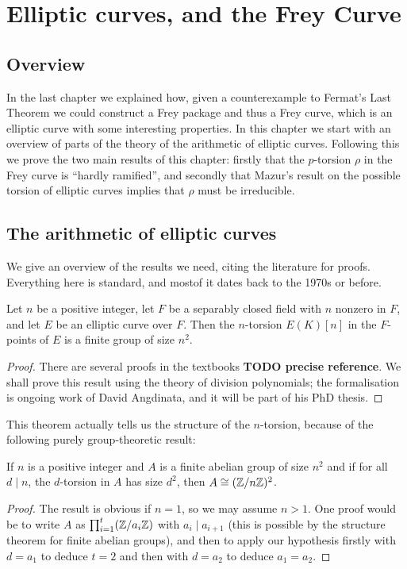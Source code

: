 \chapter{Elliptic curves, and the Frey Curve}

\section{Overview}

In the last chapter we explained how, given a counterexample to Fermat's Last Theorem we could construct a Frey package and thus a Frey curve, which is an elliptic curve with some interesting properties. In this chapter we start with an overview of parts of the theory of the arithmetic of elliptic curves. Following
this we prove the two main results of this chapter: firstly that the $p$-torsion $\rho$ in the Frey curve is ``hardly ramified'', and secondly that Mazur's result on the possible torsion of elliptic curves implies that $\rho$ must be irreducible.

\section{The arithmetic of elliptic curves}

We give an overview of the results we need, citing the literature for proofs. Everything here is
 standard, and mostof it dates back to the 1970s or before.

\begin{theorem}\label{Elliptic_curve_n_torsion_size}\tangled{}
  Let $n$ be a positive integer, let $F$ be a separably closed
  field with $n$ nonzero in $F$, and let $E$ be an elliptic curve over $F$. Then the $n$-torsion $E(K)[n]$ 
  in the $F$-points of $E$ is a finite group of size $n^2$.
\end{theorem}
\begin{proof}
  There are several proofs in the textbooks {\bf TODO precise reference}. We shall prove this result using the theory of division polynomials; the formalisation is ongoing work of David Angdinata, and it will be part of his PhD thesis.
\end{proof}

This theorem actually tells us the structure of the $n$-torsion, because of the following
purely group-theoretic result:
\begin{lemma}\label{group_theory_lemma}
  If $n$ is a positive integer and $A$ is a finite
  abelian group of size $n^2$ and if for all $d\mid n$, the $d$-torsion in $A$ has size $d^2$, 
  then $A\cong (\mathbb{Z}/n\mathbb{Z})^2$. 
\end{lemma}
\begin{proof}
  The result is obvious if $n=1$, so we may assume $n>1$. One proof would be to write $A$ as $\prod_{i=1}^t(\mathbb{Z}/a_i\mathbb{Z})$
  with $a_i\mid a_{i+1}$ (this is possible by the structure theorem for finite abelian groups), and then to apply our hypothesis firstly with $d=a_1$ to deduce $t=2$ and then with $d=a_2$ to deduce $a_1=a_2$.
\end{proof}

